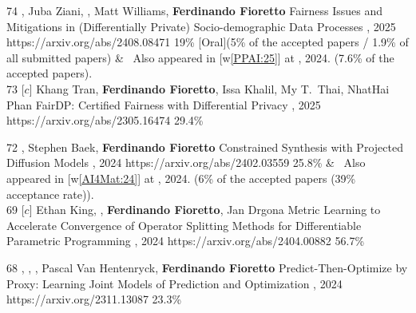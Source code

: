 \begin{pubs}
\confentryAwd
	{74}
	{, Juba Ziani, , Matt Williams, {\bf Ferdinando Fioretto}}
	{Fairness Issues and Mitigations in (Differentially Private) Socio-demographic Data Processes}
	{\procAAAI, 2025}
	{https://arxiv.org/abs/2408.08471}
	{19\%} %
	{[Oral]}{(5\% of the accepted papers / 1.9\% of all submitted papers)}
&	\hspace{4pt} \faAngleRight\, Also appeared in [w\ref{PPAI:25}] at , 2024. 
	\hspace{4pt} \textcolor{purple}{\faTrophy {\bf [Oral]}} (7.6\% of the accepted papers).\\[0.5em]

\confentry
	{73}
	{[$c$] Khang Tran, {\bf Ferdinando Fioretto}, Issa Khalil, My T.~Thai, NhatHai Phan}
	{FairDP: Certified Fairness with Differential Privacy}
	{, 2025}
	{https://arxiv.org/abs/2305.16474}
	{29.4\%}%


\confentry
	{72}
	{, Stephen Baek, {\bf Ferdinando Fioretto}}
  	{Constrained Synthesis with Projected Diffusion Models}
  	{\procNeurIPS, 2024}
	{https://arxiv.org/abs/2402.03559}
	{25.8\%}
&	\hspace{4pt} \faAngleRight\, Also appeared in [w\ref{AI4Mat:24}] at , 2024. 
	\hspace{4pt} \textcolor{purple}{\faTrophy {\bf [Oral]}} (6\% of the accepted papers (39\% acceptance rate)).\\[0.5em]

\confentry
	{69}
	{[$c$] Ethan King, , {\bf Ferdinando Fioretto}, Jan Drgona}
	{Metric Learning to Accelerate Convergence of Operator Splitting Methods for Differentiable Parametric Programming}
	{, 2024}
	{https://arxiv.org/abs/2404.00882}
	{56.7\%}

\confentry
	{68}
	{, , , Pascal Van Hentenryck, {\bf Ferdinando Fioretto}}
	{Predict-Then-Optimize by Proxy: Learning Joint Models of Prediction and Optimization}
  	{\procECAI, 2024}
  	{https://arxiv.org/2311.13087}
  	{23.3\%} %


\end{pubs}
